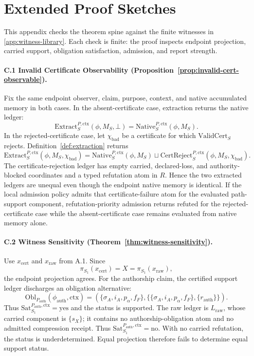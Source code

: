 \documentclass[11pt,twoside]{article}
\theoremstyle{definition}
\newcommand{\Obl}{\mathrm{Obl}}
\newcommand{\ValidCert}{\mathrm{ValidCert}}
\newcommand{\CertReject}{\mathrm{CertReject}}
\newcommand{\Extract}{\mathrm{Extract}}
\newcommand{\Sat}{\mathrm{Sat}}
\newcommand{\Native}{\mathrm{Native}}
\newcommand{\ctx}{\mathrm{ctx}}
\newcommand{\supported}{\mathrm{supported}}
\newcommand{\refuted}{\mathrm{refuted}}
\newcommand{\underdetermined}{\mathrm{underdetermined}}
\begin{document}
\section{Extended Proof Sketches}
\label{app:proofs}

This appendix checks the theorem spine against the finite witnesses in
\cref{app:witness-library}. Each check is finite: the proof inspects endpoint
projection, carried support, obligation satisfaction, admission, and report
strength.

\paragraph{C.1 Invalid Certificate Observability (Proposition~\ref{prop:invalid-cert-observable}).}
Fix the same endpoint observer, claim, purpose, context, and native accumulated
memory in both cases. In the absent-certificate case, extraction returns the
native ledger:
\[
  \Extract_S^{P,\ctx}(\phi,M_S,\bot)=\Native_S^{P,\ctx}(\phi,M_S).
\]
In the rejected-certificate case, let $\chi_{\mathrm{bad}}$ be a certificate
for which $\ValidCert_S$ rejects. Definition~\ref{def:extraction} returns
\[
  \Extract_S^{P,\ctx}(\phi,M_S,\chi_{\mathrm{bad}})
  =
  \Native_S^{P,\ctx}(\phi,M_S)\sqcup
  \CertReject_S^{P,\ctx}(\phi,M_S,\chi_{\mathrm{bad}}).
\]
The certificate-rejection ledger has empty carried, declared-loss, and
authority-blocked coordinates and a typed refutation atom in $R$. Hence the two
extracted ledgers are unequal even though the endpoint native memory is
identical. If the local admission policy admits that certificate-failure atom
for the evaluated path-support component, refutation-priority admission returns
$\refuted$ for the rejected-certificate case while the absent-certificate case
remains evaluated from native memory alone.

\paragraph{C.2 Witness Sensitivity (Theorem~\ref{thm:witness-sensitivity}).}
Use $x_{\mathrm{cert}}$ and $x_{\mathrm{raw}}$ from A.1. Since
\[
  \pi_{S_1}(x_{\mathrm{cert}})=X=\pi_{S_1}(x_{\mathrm{raw}}),
\]
the endpoint projection agrees. For the authorship claim, the certified support
ledger discharges an obligation alternative:
\[
  \Obl_{P_{\mathrm{auth}}}(\phi_{\mathrm{auth}},\ctx)
  =
  (\{\sigma_A,i_A,p_\alpha,f_F\},
   \{\{\sigma_A,i_A,p_\alpha,f_F\},\{r_{\mathrm{auth}}\}\}).
\]
Thus $\Sat_{S_1}^{P_{\mathrm{auth}},\ctx}=\mathrm{yes}$ and the status is
$\supported$. The raw ledger is $L_{\mathrm{raw}}$, whose carried component is
$\{s_X\}$; it contains no authorship-obligation atom and no admitted
compression receipt. Thus $\Sat_{S_1}^{P_{\mathrm{auth}},\ctx}=\mathrm{no}$.
With no carried refutation, the status is $\underdetermined$. Equal projection
therefore fails to determine equal support status.
\end{document}
